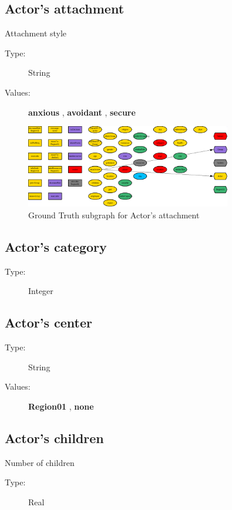 \documentclass{article}%
\begin{document}
%
\subsection{Actor's attachment}%
\label{subsec:Actor's attachment}%
Attachment style%
\begin{description}%
\item[Type:]%
String%
\item[Values:]%
\textbf{anxious}%
, %
\textbf{avoidant}%
, %
\textbf{secure}%
\end{description}%


\begin{figure}[ht]%
\centering%
\includegraphics[width=0.8\textwidth]{images/attachmentOfActor.png}%
\caption{Ground Truth subgraph for Actor's attachment}%
\end{figure}

%
\subsection{Actor's category}%
\label{subsec:Actor's category}%
\begin{description}%
\item[Type:]%
Integer%
\end{description}

%
\subsection{Actor's center}%
\label{subsec:Actor's center}%
\begin{description}%
\item[Type:]%
String%
\item[Values:]%
\textbf{Region01}%
, %
\textbf{none}%
\end{description}

%
\subsection{Actor's children}%
\label{subsec:Actor's children}%
Number of children%
\begin{description}%
\item[Type:]%
Real%
\end{description}%
\end{document}
